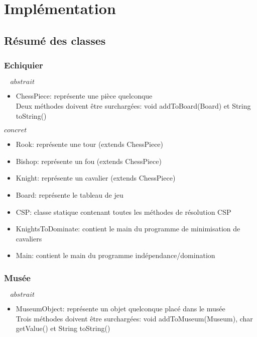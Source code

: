 \section{Implémentation}


\subsection{Résumé des classes}

\subsubsection{Echiquier}
$\ \ \ \ abstrait$
\begin{itemize}
    \item ChessPiece: représente une pièce quelconque\\
        Deux méthodes doivent être surchargées: void addToBoard(Board) et String toString()
\end{itemize}


$concret$
\begin{itemize}
    \item Rook: représente une tour (extends ChessPiece)
    \item Bishop: représente un fou (extends ChessPiece)
    \item Knight: représente un cavalier (extends ChessPiece)
    \item Board: représente le tableau de jeu
    \item CSP: classe statique contenant toutes les méthodes de résolution CSP
    \item KnightsToDominate: contient le main du programme de minimisation de cavaliers
    \item Main: contient le main du programme indépendance/domination
\end{itemize}


\newpage

\subsubsection{Musée}
$\ \ \ \ abstrait$
\begin{itemize}
    \item MuseumObject: représente un objet quelconque placé dans le musée\\
        Trois méthodes doivent être surchargées: void addToMuseum(Museum), char getValue() et String toString()
\end{itemize}

